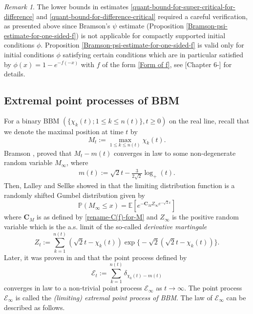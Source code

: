 \documentclass[a4paper,reqno]{amsart}%
\newcommand{\Cb}{\mathbf{C}}
\newcommand{\1}{\mathbf 1}
\theoremstyle{mine}
\numberwithin{theorem}{section}
\numberwithin{equation}{section}
\theoremstyle{remark}
\newtheorem{remark}{Remark}
\begin{document}
\begin{remark}
    The lower bounds in estimates \eqref{quant-bound-for-super-critical-for-difference} and \eqref{quant-bound-for-difference-critical} required a careful verification, as presented above since Bramson's $\psi$ estimate (Proposition \ref{Bramson-psi-estimate-for-one-sided-f}) is not applicable for compactly supported initial conditions $\phi$. Proposition \ref{Bramson-psi-estimate-for-one-sided-f} is valid only for initial conditions $\phi$ satisfying certain conditions which are in particular satisfied by $\phi(x) = 1-e^{-f(-x)}$ with $f$ of the form \eqref{Form of f}, see [Chapter 6-\cite{Bovier_book}] for details.
\end{remark}
 

 



\subsection{Extremal point processes of BBM}
\label{Subsection Extremal Process}


For a binary  BBM $(\{\chi_k(t); 1\leq k\leq n(t)\}, t\ge0)$ on the real line, recall that we denote the maximal position at time $t$ by
\[
M_t:=\max_{1\leq k\leq n(t)}\chi_k(t). 
\]
Bramson \cite{Bramson78}, \cite{Bramson83} proved that $M_t-m(t)$ converges in law to some non-degenerate random variable $M_\infty$, where 
\begin{align}\label{e.m}
m(t):= \sqrt{2}t - \frac{3}{2\sqrt{2}}\log_{+}(t).
\end{align}
Then, Lalley and Sellke showed in \cite{Lalley_Sellke} that the limiting distribution function is a randomly shifted Gumbel distribution given by 
\begin{equation}\label{limiting-distribution-by-derivative-martingale}
    \mathbb{P}(M_\infty \leq x) =\mathbb{E}[e^{-\Cb_MZ_\infty e^{-\sqrt{2}x}}]
\end{equation} 
where $\Cb_M$ is as defined by \eqref{rename-C(f)-for-M} and $Z_\infty $ is the positive random variable which is the a.s. limit of the so-called \textit{derivative martingale}
\[Z_t := \sum_{k=1}^{n(t)}(\sqrt{2}t- \chi_k(t))\exp\bigl\{-\sqrt{2}(\sqrt{2}t- \chi_k(t))\bigr\}.\]
Later, it was proven in \cite{ABK13} and \cite{ABBS13} that the point process defined by
\begin{equation}\label{abk-conv}
    \mathcal{E}_t := \sum_{k=1}^{n(t)}\delta_{\chi_k(t)- m(t)} 
\end{equation}
converges in law to a non-trivial point process $\mathcal{E}_{\infty}$ as $t\to \infty$. The point process $\mathcal{E}_\infty$ is called the \textit{(limiting) extremal point process of BBM}. The law of $\mathcal{E}_\infty$ can be described as follows. 
\end{document}
